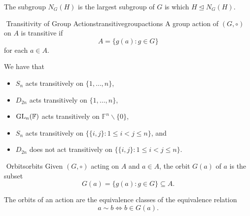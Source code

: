         \begin{remark*}
            The subgroup \(N_G(H)\) is the largest subgroup of \(G\) is which \(H\trianglelefteq N_G(H)\).
        \end{remark*}
        \begin{definition}{\Stop\,\,Transitivity of Group Actions}{transitivegroupactions}
            A group action of \((G,\circ)\) on \(A\) is transitive if
            \begin{equation*}
                A=\{g(a):g\in G\}
            \end{equation*}
            for each \(a\in A\).
        \end{definition}
        \begin{example}
            We have that
            \begin{itemize}
                \item \(S_n\) acts transitively on \(\{1,\ldots,n\}\),
                \item \(D_{2n}\) acts transitively on \(\{1,\ldots,n\}\),
                \item \(\operatorname{GL}_n(\mathbb{F})\) acts transitively on \(\mathbb{F}^n\backslash\{0\}\),
                \item \(S_n\) acts transitively on \(\{\{i,j\}:1\leq i<j\leq n\}\), and 
                \item \(D_{2n}\) does not act transitively on \(\{\{i,j\}:1\leq i<j\leq n\}\).
            \end{itemize}
        \end{example}
        \begin{definition}{\Stop\,\,Orbits}{orbits}
            Given \((G,\circ)\) acting on \(A\) and \(a\in A\), the orbit \(G(a)\) of \(a\) is the subset
            \begin{equation*}
                G(a)=\{g(a):g\in G\}\subseteq A.
            \end{equation*}
        \end{definition}
        \begin{remark*}
            The orbits of an action are the equivalence classes of the equivalence relation
            \begin{equation*}
                a\sim b\iff b\in G(a).
            \end{equation*}
        \end{remark*}